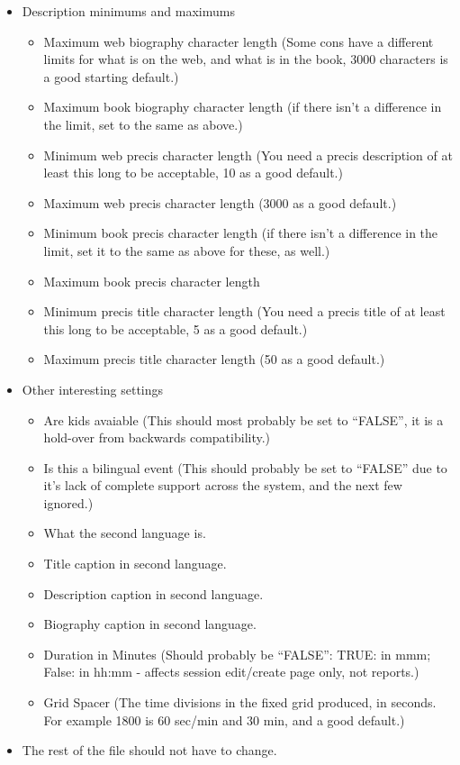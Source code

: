\documentclass[tablesignature]{scrartcl}
\begin{document}
\begin{itemize}
\item Description minimums and maximums
\label{sec-1_2_3_4}%
\begin{itemize}
\item Maximum web biography character length (Some cons have a different limits for what is on the web, and what is in the book, 3000 characters is a good starting default.)
\item Maximum book biography character length (if there isn't a difference in the limit, set to the same as above.)
\item Minimum web precis character length (You need a precis description of at least this long to be acceptable, 10 as a good default.)
\item Maximum web precis character length (3000 as a good default.)
\item Minimum book precis character length (if there isn't a difference in the limit, set it to the same as above for these, as well.)
\item Maximum book precis character length
\item Minimum precis title character length (You need a precis title of at least this long to be acceptable, 5 as a good default.)
\item Maximum precis title character length (50 as a good default.)
\end{itemize}


\item Other interesting settings
\label{sec-1_2_3_5}%
\begin{itemize}
\item Are kids avaiable (This should most probably be set to ``FALSE'', it is a hold-over from backwards compatibility.)
\item Is this a bilingual event (This should probably be set to ``FALSE'' due to it's lack of complete support across the system, and the next few ignored.)
\item What the second language is.
\item Title caption in second language.
\item Description caption in second language.
\item Biography caption in second language.
\item Duration in Minutes (Should probably be ``FALSE'': TRUE: in mmm; False: in hh:mm - affects session edit/create page only, not reports.)
\item Grid Spacer (The time divisions in the fixed grid produced, in seconds.  For example 1800 is 60 sec/min and 30 min, and a good default.)
\end{itemize}


\item The rest of the file should not have to change.\\
\label{sec-1_2_3_6}%
\end{itemize} %
\end{document}
